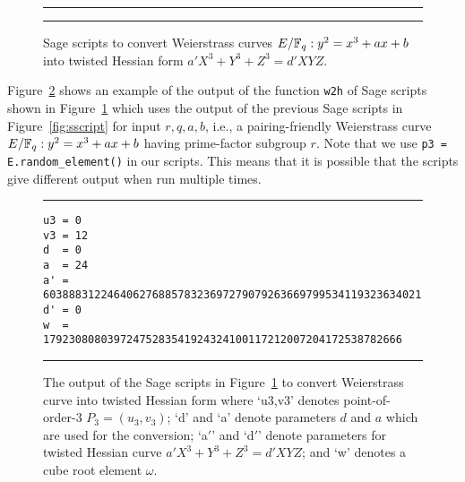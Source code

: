 \begin{figure}
\hrule\medskip
{}
\hrule
\caption{Sage scripts to convert Weierstrass curves $E/\mathbb{F}_{q}: y^2 = x^3 + ax + b$
into twisted Hessian form $a'X^3 + Y^3 + Z^3 = d'XYZ$.}
\label{fig:scon}
\end{figure}

Figure~\ref{fig:conout} shows an example of the output of the function \texttt{w2h} of Sage scripts shown in Figure~\ref{fig:scon}
which uses the output of the previous Sage scripts in Figure~\ref{fig:sscript} for input $r,q,a,b$,
i.e., a pairing-friendly Weierstrass curve $E/\mathbb{F}_{q}: y^2 = x^3 + ax + b$ having prime-factor subgroup $r$.
Note that we use \texttt{p3 = E.random\_element()} in our scripts.
This means that it is possible that the scripts give different output when run multiple times.

\begin{figure}
\hrule\medskip
{\scriptsize
\begin{verbatim}
u3 = 0
v3 = 12
d  = 0
a  = 24
a' = 60388831224640627688578323697279079263669799534119323634021
d' = 0
w  = 17923080803972475283541924324100117212007204172538782666
\end{verbatim}
}
\hrule
\caption{The output of the Sage scripts in Figure~\ref{fig:scon}
to convert Weierstrass curve into twisted Hessian form where
`u3,v3' denotes point-of-order-3 $P_3 = (u_3,v_3)$;
`d' and `a' denote parameters $d$ and $a$ which are used for the conversion;
`a$'$' and `d$'$' denote parameters for twisted Hessian curve $a'X^3 + Y^3 + Z^3 = d'XYZ$; and
`w' denotes a cube root element $\omega$.
}
\label{fig:conout}
\end{figure}

